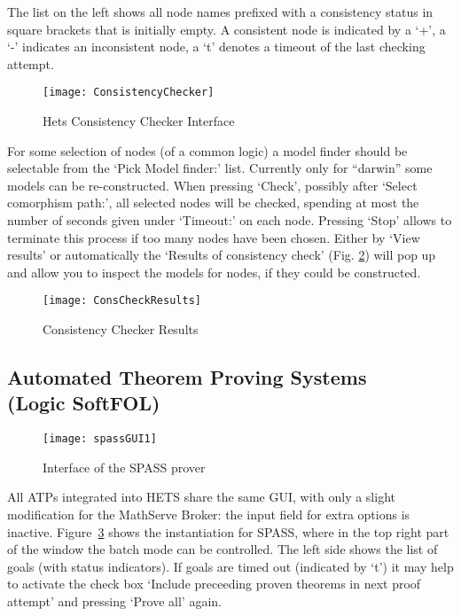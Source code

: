 \documentclass{article}
\newcommand{\normalTEXTSC}[2]{{#1\scriptsize#2}}
\newcommand     {\Hets}{\normalTEXTSC{H}{ETS}\xspace}
\newcommand     {\SPASS}{\normalTEXTSC{S}{PASS}\xspace}
\begin{document}
The list on the left shows all node names prefixed with a consistency status
in square brackets that is initially empty.  A consistent node is indicated by
a `+', a `-' indicates an inconsistent node, a `t' denotes a timeout of the last
checking attempt.

\begin{figure}
\centering
\texttt{[image: ConsistencyChecker]}
\caption{Hets Consistency Checker Interface\label{fig:cons_window}}
\end{figure}

For some selection of nodes (of a common logic) a model finder should be
selectable from the `Pick Model finder:' list. Currently only for ``darwin''
some \CASL models can be re-constructed. When pressing `Check', possibly after
`Select comorphism path:', all selected nodes will be checked, spending at
most the number of seconds given under `Timeout:' on each node. Pressing
`Stop' allows to terminate this process if too many nodes have been chosen.
Either by `View results' or automatically the `Results of consistency check'
(Fig. \ref{fig:cons_res}) will pop up and allow you to inspect the models for
nodes, if they could be constructed.

\begin{figure}
\centering
\texttt{[image: ConsCheckResults]}
\caption{Consistency Checker Results\label{fig:cons_res}}
\end{figure}

\subsection[Automated Theorem Proving Systems]
{Automated Theorem Proving Systems\\(Logic SoftFOL)}
\label{sec:ATP}

\begin{figure}
\centering
\texttt{[image: spassGUI1]}
\caption{Interface of the \SPASS prover\label{fig:SPASS_GUI}}
\end{figure}

All ATPs integrated into \Hets share the same GUI, with only a slight
modification for the MathServe Broker: the input field for extra options is
inactive. Figure~\ref{fig:SPASS_GUI} shows the instantiation for \SPASS, where
in the top right part of the window the batch mode can be controlled.  The
left side shows the list of goals (with status indicators).  If goals are
timed out (indicated by `t') it may help to activate the check box `Include
preceeding proven theorems in next proof attempt' and pressing `Prove all'
again.
\end{document}
